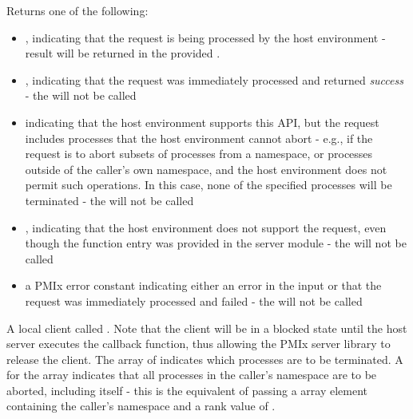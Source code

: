 Returns one of the following:

\begin{itemize}
    \item {}, indicating that the request is being processed by the host environment - result will be returned in the provided .
    \item {}, indicating that the request was immediately processed and returned \textit{success} - the  will not be called
    \item {} indicating that the host environment supports this \ac{API}, but the request includes processes that the host environment cannot abort - e.g., if the request is to abort subsets of processes from a namespace, or processes outside of the caller's own namespace, and the host environment does not permit such operations. In this case, none of the specified processes will be terminated - the  will not be called
    \item {}, indicating that the host environment does not support the request, even though the function entry was provided in the server module - the  will not be called
    \item a PMIx error constant indicating either an error in the input or that the request was immediately processed and failed - the  will not be called
\end{itemize}

\descr

A local client called .
Note that the client will be in a blocked state until the host server executes the callback function, thus allowing the \ac{PMIx} server library to release the client.
The array of  indicates which processes are to be terminated.
A  for the  array indicates that all processes in the caller's namespace are to be aborted, including itself - this is the equivalent of passing a  array element containing the caller's namespace and a rank value of .

\subsection{}

